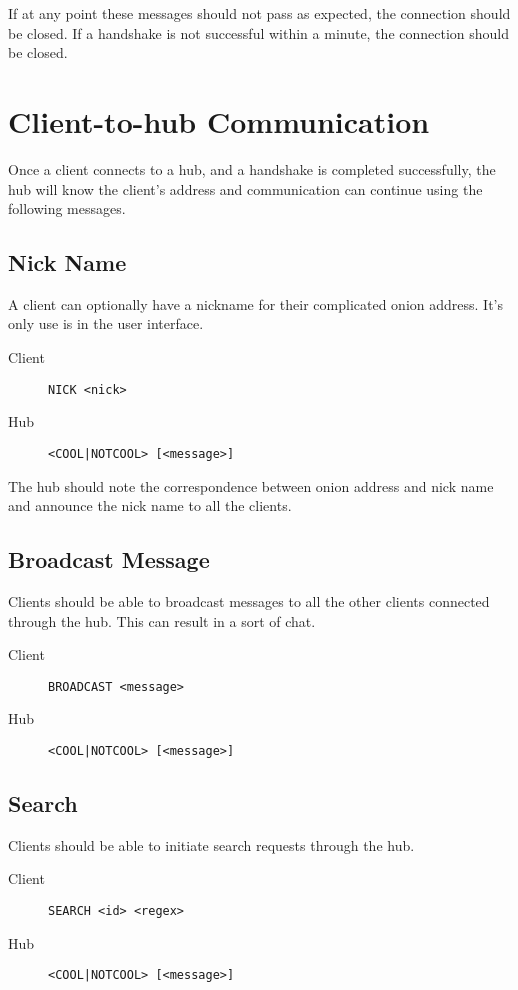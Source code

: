 \documentclass{article}
\begin{document}
If at any point these messages should not pass as expected, the connection should be closed.  If a handshake is not successful within a minute, the connection should be closed.

\section{Client-to-hub Communication}
Once a client connects to a hub, and a handshake is completed successfully, the hub will know the client's address and communication can continue using the following messages.

\subsection{Nick Name}
A client can optionally have a nickname for their complicated onion address.  It's only use is in the user interface.

\begin{description}
\item[Client] \verb+NICK <nick>+
\item[Hub] \verb+<COOL|NOTCOOL> [<message>]+
\end{description}

The hub should note the correspondence between onion address and nick name and announce the nick name to all the clients.

\subsection{Broadcast Message}
Clients should be able to broadcast messages to all the other clients connected through the hub.  This can result in a sort of chat.

\begin{description}
\item[Client] \verb+BROADCAST <message>+
\item[Hub] \verb+<COOL|NOTCOOL> [<message>]+
\end{description}

\subsection{Search}
Clients should be able to initiate search requests through the hub.

\begin{description}
\item[Client] \verb+SEARCH <id> <regex>+
\item[Hub] \verb+<COOL|NOTCOOL> [<message>]+
\end{description}
\end{document}
